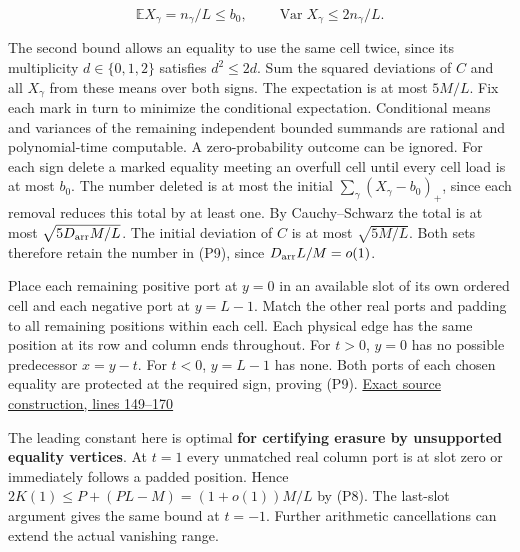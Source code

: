 \documentclass[11pt,a4paper]{article}
\begin{document}
\[
 \mathbb EX_\gamma=n_\gamma/L\le b_0,\qquad
 \operatorname{Var}X_\gamma\le 2n_\gamma/L .
\]

The second bound allows an equality to use the same cell twice, since
its multiplicity \(d\in\{0,1,2\}\) satisfies \(d^2\le2d\). Sum the
squared deviations of \(C\) and all \(X_\gamma\) from these means over
both signs. The expectation is at most \(5M/L\). Fix each mark in turn
to minimize the conditional expectation. Conditional means and variances
of the remaining independent bounded summands are rational and
polynomial-time computable. A zero-probability outcome can be ignored.
For each sign delete a marked equality meeting an overfull cell until
every cell load is at most \(b_0\). The number deleted is at most the
initial \(\sum_\gamma(X_\gamma-b_0)_+\), since each removal reduces this
total by at least one. By Cauchy--Schwarz the total is at most
\(\sqrt{5D_{\rm arr}M/L}\). The initial deviation of \(C\) is at most
\(\sqrt{5M/L}\). Both sets therefore retain the number in (P9), since
\(D_{\rm arr}L/M=o(1)\).

Place each remaining positive port at \(y=0\) in an available slot of
its own ordered cell and each negative port at \(y=L-1\). Match the
other real ports and padding to all remaining positions within each
cell. Each physical edge has the same position at its row and column
ends throughout. For \(t>0\), \(y=0\) has no possible predecessor
\(x=y-t\). For \(t<0\), \(y=L-1\) has none. Both ports of each chosen
equality are protected at the required sign, proving (P9).
\href{https://github.com/openai/math/blob/main/preprints/The-Exponential-Time-Hypothesis-is-False-October-25-2026/build/quantitative-contraction.tex\#L149}{Exact
source construction, lines 149--170}

The leading constant here is optimal \textbf{for certifying erasure by
unsupported equality vertices}. At \(t=1\) every unmatched real column
port is at slot zero or immediately follows a padded position. Hence
\(2K(1)\le P+(PL-M)=(1+o(1))M/L\) by (P8). The last-slot argument gives
the same bound at \(t=-1\). Further arithmetic cancellations can extend
the actual vanishing range.
\end{document}
